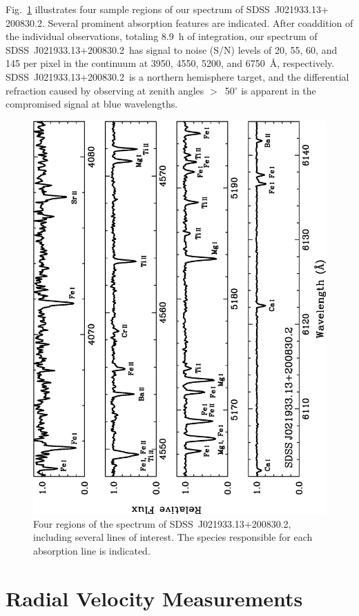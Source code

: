\documentclass[useAMS,usenatbib,usegraphicx]{mn2e}
\def\seg{\mbox{SDSS~J021933.13$+$200830.2}}
\def\segalt{\mbox{SDSS~J021933.13$+$200830.2}}
\begin{document}
Fig.~\ref{spectplot} illustrates
four sample regions of our spectrum of \seg.
Several prominent absorption features are indicated.
After coaddition of the individual observations,
totaling 8.9~h of integration, our spectrum of \seg\ 
has signal to noise (S/N) levels of 20, 55, 60, and 145
per pixel in the continuum
at 3950, 4550, 5200, and 6750~\AA, respectively.
\seg\ is a northern hemisphere target, and
the differential refraction
caused by observing at zenith angles $>$~50$^{\circ}$
is apparent in the compromised signal at blue wavelengths.


\begin{figure}
\centering
\includegraphics[angle=270,width=5.0in]{fig1.eps}
\caption{
\label{spectplot}
Four regions of the spectrum of \segalt,
including several lines of interest.
The species responsible for each absorption line is indicated.
}
\end{figure}


\section{Radial Velocity Measurements}
\label{rv}
\end{document}
